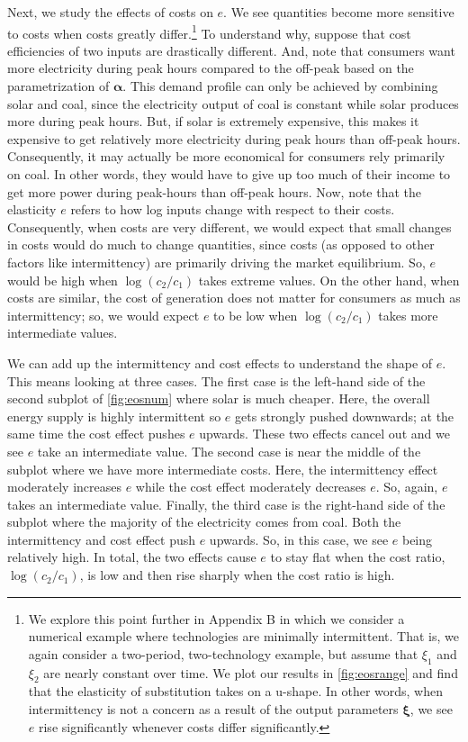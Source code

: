 \documentclass[11pt,a4paper,leqno]{extarticle}
\begin{document}
	Next, we study the effects of costs on $e$. We see quantities become more sensitive to costs when costs greatly differ.\footnote{We explore this point further in Appendix B in which we consider a numerical example where technologies are minimally intermittent. That is, we again consider a two-period, two-technology example, but assume that $\xi_1$ and $\xi_2$ are nearly constant over time. We plot our results in \autoref{fig:eosrange} and find that the elasticity of substitution takes on a u-shape. In other words, when intermittency is not a concern as a result of the output parameters $\boldsymbol{\xi}$, we see $e$ rise significantly whenever costs differ significantly. 
	} To understand why, suppose that cost efficiencies of two inputs are drastically different. And, note that consumers want more electricity during peak hours compared to the off-peak based on the parametrization of $\boldsymbol{\alpha}$. This demand profile can only be achieved by combining solar and coal, since the electricity output of coal is constant while solar produces more during peak hours. But, if solar is extremely expensive, this makes it expensive to get relatively more electricity during peak hours than off-peak hours.  Consequently, it may actually be more economical for consumers rely primarily on coal. In other words, they would have to give up too much of their income to get more power during peak-hours than off-peak hours.  Now, note that the elasticity $e$ refers to how log inputs change with respect to their costs. Consequently, when costs are very different, we would expect that small changes in costs would do much to change quantities, since costs (as opposed to other factors like intermittency) are primarily driving the market equilibrium. So, $e$ would be high when $\log(c_2/c_1)$ takes extreme values. On the other hand, when costs are similar, the cost of generation does not matter for consumers as much as intermittency; so, we would expect $e$ to be low when $\log(c_2/c_1)$ takes more intermediate values. 
	
	We can add up the intermittency and cost effects to understand the shape of $e$. This means looking at three cases. The first case is the left-hand side of the second subplot of \autoref{fig:eosnum} where solar is much cheaper. Here, the overall energy supply is highly intermittent so $e$ gets strongly pushed downwards; at the same time the cost effect pushes $e$ upwards. These two effects cancel out and we see $e$ take an intermediate value. The second case is near the middle of the subplot where we have more intermediate costs. Here, the intermittency effect moderately increases $e$ while the cost effect moderately decreases $e$. So, again, $e$ takes an intermediate value. Finally, the third case is the right-hand side of the subplot where the majority of the electricity comes from coal. Both the intermittency and cost effect push $e$ upwards. So, in this case, we see $e$ being relatively high. In total, the two effects cause $e$ to stay flat when the cost ratio, $\log(c_2/c_1)$, is low and then rise sharply when the cost ratio is high. 
	
\end{document}
